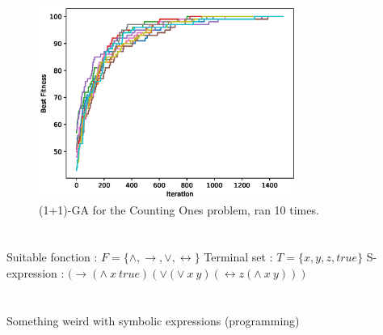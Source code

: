 \documentclass[11pt]{article}
\begin{document}
\begin{figure}[H]
\centering
\includegraphics[width=0.75\textwidth]{images/ga.eps}
\caption{(1+1)-GA for the Counting Ones problem, ran 10 times.}
\label{fig:ga}
\end{figure}

\section{}
Suitable fonction : $F = \{\wedge,\rightarrow, \vee,\leftrightarrow \}$
\newline Terminal set : $T = \{x,y,z,true\}$
\newline S-expression : $ (\rightarrow (\land\ x\ true)(\lor (\lor\ x\ y)(\leftrightarrow z(\land\ x\ y))) $

\section{}
Something weird with symbolic expressions (programming)
\end{document}
